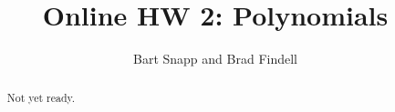 \documentclass[handout,space,nooutcomes]{xourse}
\title{Online HW 2: Polynomials}
\author{Bart Snapp and Brad Findell}
\begin{document}
\begin{abstract}
Not yet ready.   
\end{abstract}
\maketitle

{}
\end{document}
